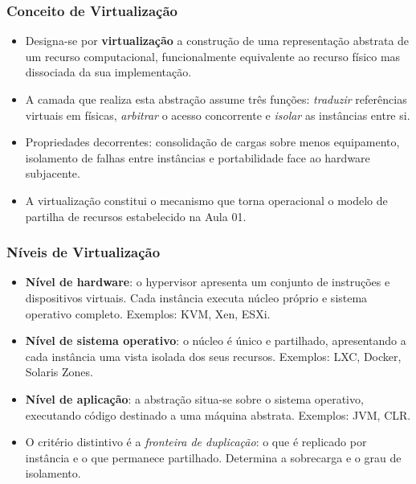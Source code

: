 \documentclass[aspectratio=169]{beamer}
\begin{document}
\begin{frame}
\frametitle{Conceito de Virtualização}
\begin{itemize}
    \setlength\itemsep{0.4cm}
    \item Designa-se por \textbf{virtualização} a construção de uma representação abstrata de um recurso computacional, funcionalmente equivalente ao recurso físico mas dissociada da sua implementação.
    \item A camada que realiza esta abstração assume três funções: \emph{traduzir} referências virtuais em físicas, \emph{arbitrar} o acesso concorrente e \emph{isolar} as instâncias entre si.
    \item Propriedades decorrentes: consolidação de cargas sobre menos equipamento, isolamento de falhas entre instâncias e portabilidade face ao hardware subjacente.
    \item A virtualização constitui o mecanismo que torna operacional o modelo de partilha de recursos estabelecido na Aula 01.
\end{itemize}
\end{frame}

\begin{frame}
\frametitle{Níveis de Virtualização}
\begin{itemize}
    \setlength\itemsep{0.35cm}
    \item \textbf{Nível de hardware}: o hypervisor apresenta um conjunto de instruções e dispositivos virtuais. Cada instância executa núcleo próprio e sistema operativo completo. Exemplos: KVM, Xen, ESXi.
    \item \textbf{Nível de sistema operativo}: o núcleo é único e partilhado, apresentando a cada instância uma vista isolada dos seus recursos. Exemplos: LXC, Docker, Solaris Zones.
    \item \textbf{Nível de aplicação}: a abstração situa-se sobre o sistema operativo, executando código destinado a uma máquina abstrata. Exemplos: JVM, CLR.
    \item O critério distintivo é a \emph{fronteira de duplicação}: o que é replicado por instância e o que permanece partilhado. Determina a sobrecarga e o grau de isolamento.
\end{itemize}
\end{frame}
\end{document}
